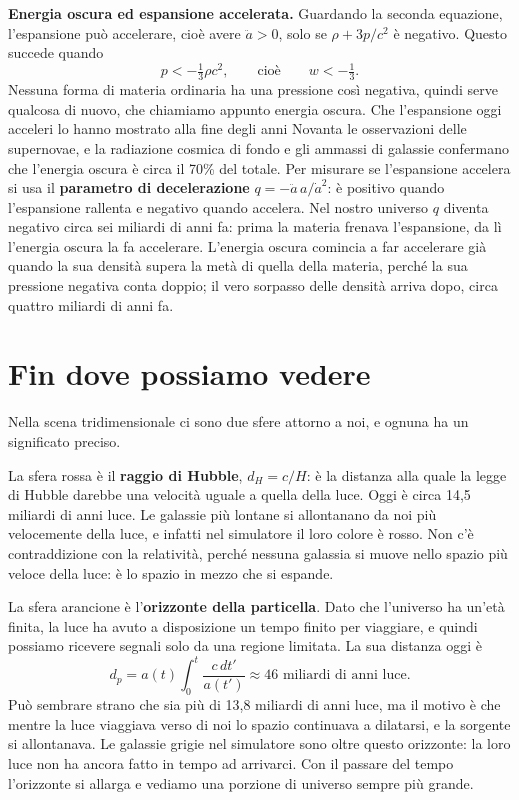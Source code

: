 \documentclass[12pt,a4paper]{article}
\begin{document}
\textbf{Energia oscura ed espansione accelerata.} Guardando la seconda equazione, l'espansione può accelerare, cioè avere $\ddot a > 0$, solo se $\rho + 3p/c^2$ è negativo. Questo succede quando
\[ p < -\tfrac{1}{3}\rho c^2 , \qquad \text{cioè} \qquad w < -\tfrac{1}{3} . \]
Nessuna forma di materia ordinaria ha una pressione così negativa, quindi serve qualcosa di nuovo, che chiamiamo appunto energia oscura. Che l'espansione oggi acceleri lo hanno mostrato alla fine degli anni Novanta le osservazioni delle supernovae, e la radiazione cosmica di fondo e gli ammassi di galassie confermano che l'energia oscura è circa il 70\% del totale. Per misurare se l'espansione accelera si usa il \textbf{parametro di decelerazione} $q = -\ddot a\, a / \dot a^2$: è positivo quando l'espansione rallenta e negativo quando accelera. Nel nostro universo $q$ diventa negativo circa sei miliardi di anni fa: prima la materia frenava l'espansione, da lì l'energia oscura la fa accelerare. L'energia oscura comincia a far accelerare già quando la sua densità supera la metà di quella della materia, perché la sua pressione negativa conta doppio; il vero sorpasso delle densità arriva dopo, circa quattro miliardi di anni fa.

\section{Fin dove possiamo vedere}
Nella scena tridimensionale ci sono due sfere attorno a noi, e ognuna ha un significato preciso.

La sfera rossa è il \textbf{raggio di Hubble}, $d_H = c/H$: è la distanza alla quale la legge di Hubble darebbe una velocità uguale a quella della luce. Oggi è circa 14,5 miliardi di anni luce. Le galassie più lontane si allontanano da noi più velocemente della luce, e infatti nel simulatore il loro colore è rosso. Non c'è contraddizione con la relatività, perché nessuna galassia si muove nello spazio più veloce della luce: è lo spazio in mezzo che si espande.

La sfera arancione è l'\textbf{orizzonte della particella}. Dato che l'universo ha un'età finita, la luce ha avuto a disposizione un tempo finito per viaggiare, e quindi possiamo ricevere segnali solo da una regione limitata. La sua distanza oggi è
\[ d_p = a(t)\int_0^{t} \frac{c\,dt'}{a(t')} \approx 46 \text{ miliardi di anni luce}. \]
Può sembrare strano che sia più di 13,8 miliardi di anni luce, ma il motivo è che mentre la luce viaggiava verso di noi lo spazio continuava a dilatarsi, e la sorgente si allontanava. Le galassie grigie nel simulatore sono oltre questo orizzonte: la loro luce non ha ancora fatto in tempo ad arrivarci. Con il passare del tempo l'orizzonte si allarga e vediamo una porzione di universo sempre più grande.
\end{document}
